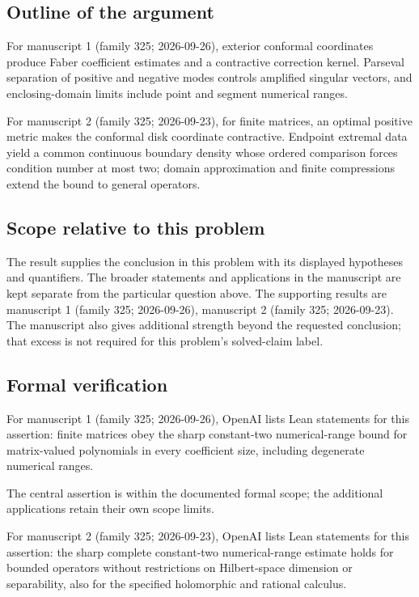 \documentclass[11pt]{article}
\begin{document}
\subsection{Outline of the argument}
For manuscript 1 (family 325; 2026-09-26), exterior conformal coordinates produce Faber coefficient estimates and a contractive correction kernel. Parseval separation of positive and negative modes controls amplified singular vectors, and enclosing-domain limits include point and segment numerical ranges.

For manuscript 2 (family 325; 2026-09-23), for finite matrices, an optimal positive metric makes the conformal disk coordinate contractive. Endpoint extremal data yield a common continuous boundary density whose ordered comparison forces condition number at most two; domain approximation and finite compressions extend the bound to general operators.

\subsection{Scope relative to this problem}
The result supplies the conclusion in this problem with its displayed hypotheses and quantifiers. The broader statements and applications in the manuscript are kept separate from the particular question above. The supporting results are manuscript 1 (family 325; 2026-09-26), manuscript 2 (family 325; 2026-09-23). The manuscript also gives additional strength beyond the requested conclusion; that excess is not required for this problem's solved-claim label.

\subsection{Formal verification}
For manuscript 1 (family 325; 2026-09-26), OpenAI lists Lean statements for this assertion: finite matrices obey the sharp constant-two numerical-range bound for matrix-valued polynomials in every coefficient size, including degenerate numerical ranges.

The central assertion is within the documented formal scope; the additional applications retain their own scope limits.

For manuscript 2 (family 325; 2026-09-23), OpenAI lists Lean statements for this assertion: the sharp complete constant-two numerical-range estimate holds for bounded operators without restrictions on Hilbert-space dimension or separability, also for the specified holomorphic and rational calculus.
\end{document}
